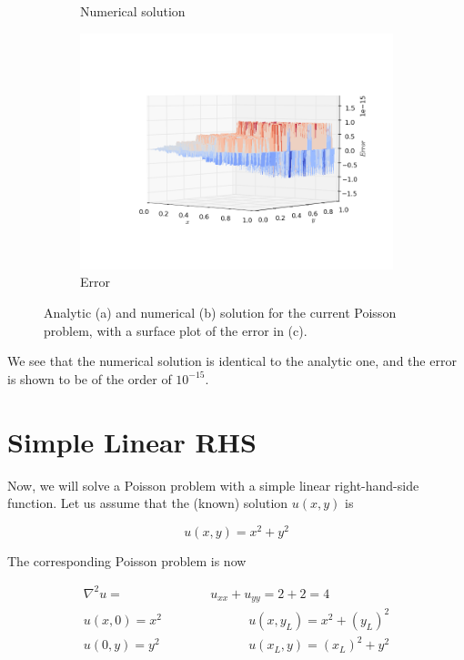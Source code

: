 \documentclass[11pt]{report}
\begin{document}
\begin{figure}[h!]
\begin{subfigure}{0.5\textwidth}
  \caption{Numerical solution}
  \label{fig:sub2}
\end{subfigure}
\begin{subfigure}{0.6\textwidth}
  \centering
  \includegraphics[width=1.0\linewidth]{images/example1_error}
  \caption{Error}
  \label{fig:sub2}
\end{subfigure}
\caption{Analytic (a) and numerical (b) solution for the current Poisson problem, with a surface plot of the  error in (c).}
\label{fig:example1}
\end{figure}

We see that the numerical solution is identical to the analytic one, and the error is shown to be of the order of $10^{-15}$. 

\section{Simple Linear RHS}
Now, we will solve a Poisson problem with a simple linear right-hand-side function. Let us assume that the (known) solution $u(x,y)$ is 

\begin{equation}
u(x,y) = x^2 + y^2
\end{equation}

The corresponding Poisson problem is now

\begin{subequations}
\begin{align}
\nabla ^2 u = &u_{xx} + u_{yy} = 2 + 2 = 4 \\
u(x,0) = x^2 \quad \quad \quad & \quad \quad \quad u(x,y_L) = x^2 + (y_L)^2 \\
u(0,y) = y^2 \quad \quad \quad & \quad \quad \quad u(x_L,y) = (x_L)^2 + y^2
\end{align}
\end{subequations}
\end{document}
